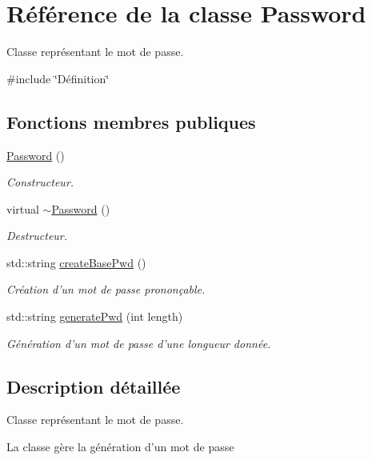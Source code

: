\hypertarget{class_password}{\section{Référence de la classe Password}
\label{class_password}
}


Classe représentant le mot de passe.  




{\ttfamily \#include \char`\"{}Définition\char`\"{}}

\subsection*{Fonctions membres publiques}
\begin{DoxyCompactItemize}
\item 
\hyperlink{class_password_a9ed0401599b14d501a8f46779048cdf2}{Password} ()
\begin{DoxyCompactList}\small\item\em Constructeur. \end{DoxyCompactList}\item 
virtual \hyperlink{class_password_ae019a63cb7332cb1c4e41d8ab7b4a619}{$\sim$\-Password} ()
\begin{DoxyCompactList}\small\item\em Destructeur. \end{DoxyCompactList}\item 
std\-::string \hyperlink{class_password_ab87e0e815c9193040046a3d945a3dbd3}{create\-Base\-Pwd} ()
\begin{DoxyCompactList}\small\item\em Création d'un mot de passe prononçable. \end{DoxyCompactList}\item 
std\-::string \hyperlink{class_password_a17cc4a113a56ec3dfc8b067e5d8805b0}{generate\-Pwd} (int length)
\begin{DoxyCompactList}\small\item\em Génération d'un mot de passe d'une longueur donnée. \end{DoxyCompactList}\end{DoxyCompactItemize}


\subsection{Description détaillée}
Classe représentant le mot de passe. 

La classe gère la génération d'un mot de passe 

